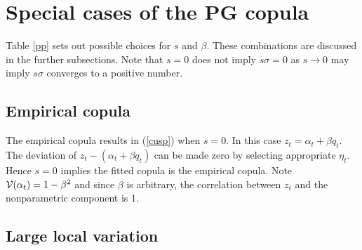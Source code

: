 \documentclass[authoryear]{elsarticle}
\newcommand{\E}{\mathrm{E}}
\newcommand{\cov}{\mathrm{cov}}
\newcommand{\Ex}{{\cal E}}
\newcommand{\cor}{\mathrm{cor}}
\newcommand{\eref}[1]{(\ref{#1})}
\newcommand{\tref}[1]{Table \ref{#1}}
\newcommand{\cq}{\ , \qquad}
\newcommand{\Vx}{{\cal V}}
\newcommand{\be}[1]{\begin{equation}\label{#1}}
\newcommand{\ee}{\end{equation}}
\begin{document}

\section{Special cases of the PG copula}

\tref{pp} sets out possible choices for $s$ and $\beta$.   These combinations are discussed in the further subsections.  Note that $s=0$ does not imply $s\sigma=0$ as $s\rightarrow 0$ may imply $s\sigma$ converges to a positive number.



\subsection{Empirical copula}

The empirical copula results in \eref{cusp} when $s=0$.  In this case   $z_t=\alpha_t+\beta q_t$.    The deviation of $z_t-(\alpha_t+\beta q_t)$ can be made zero by selecting appropriate $\eta_t$.  Hence $s=0$ implies the fitted copula is the empirical copula.  Note $\Vx(\alpha_t)=1-\beta^2$ and since $\beta$ is arbitrary, the correlation between $z_t$ and the nonparametric component is 1.

\subsection{Large local variation}
\end{document}
